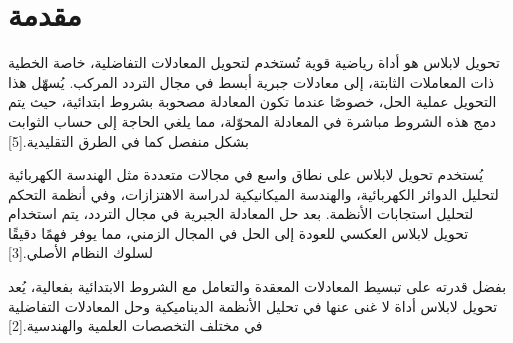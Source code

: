 \chapter*{مقدمة}

​تحويل لابلاس هو أداة رياضية قوية تُستخدم لتحويل المعادلات التفاضلية، خاصة الخطية ذات المعاملات الثابتة، إلى معادلات جبرية أبسط في مجال التردد المركب. يُسهّل هذا التحويل عملية الحل، خصوصًا عندما تكون المعادلة مصحوبة بشروط ابتدائية، حيث يتم دمج هذه الشروط مباشرة في المعادلة المحوّلة، مما يلغي الحاجة إلى حساب الثوابت بشكل منفصل كما في الطرق التقليدية.​[5]

\noindent
يُستخدم تحويل لابلاس على نطاق واسع في مجالات متعددة مثل الهندسة الكهربائية لتحليل الدوائر الكهربائية، والهندسة الميكانيكية لدراسة الاهتزازات، وفي أنظمة التحكم لتحليل استجابات الأنظمة. بعد حل المعادلة الجبرية في مجال التردد، يتم استخدام تحويل لابلاس العكسي للعودة إلى الحل في المجال الزمني، مما يوفر فهمًا دقيقًا لسلوك النظام الأصلي.​[3]

\noindent
بفضل قدرته على تبسيط المعادلات المعقدة والتعامل مع الشروط الابتدائية بفعالية، يُعد تحويل لابلاس أداة لا غنى عنها في تحليل الأنظمة الديناميكية وحل المعادلات التفاضلية في مختلف التخصصات العلمية والهندسية.[2]